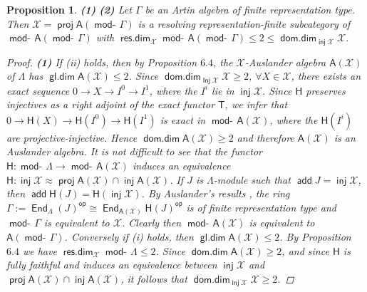 \documentclass[oneside, a4paper,reqno]{amsart}
\numberwithin{equation}{section}
\newtheorem{prop}[thm]{Proposition}
\theoremstyle{definition}
\begin{document}
\begin{prop} {\bf (1)}
{\bf (2)} Let $\Gamma$ be an Artin algebra of finite representation
type. Then ${\mathcal X} = \operatorname*{\mathsf{proj}}\mathsf{A}(\operatorname*{\mathsf{mod}-\!}\Gamma)$ is a resolving
representation-finite subcategory of $\operatorname*{\mathsf{mod}-\!}\mathsf{A}(\operatorname*{\mathsf{mod}-\!}\Gamma)$
with $\operatorname*{\mathsf{res.dim}}_{\mathcal X}\operatorname*{\mathsf{mod}-\!}\mathsf{A}(\operatorname*{\mathsf{mod}-\!}\Gamma) \leq 2 \leq
\operatorname*{\mathsf{dom.dim}}_{\operatorname*{\mathsf{inj}}{\mathcal X}}{\mathcal X}$.
\begin{proof} {\bf (1)} If (ii) holds, then by Proposition $6.4$, the
${\mathcal X}$-Auslander algebra $\mathsf{A}({\mathcal X})$ of $\Lambda$ has
$\operatorname*{\mathsf{gl.dim}}\mathsf{A}({\mathcal X}) \leq 2$. Since $\operatorname*{\mathsf{dom.dim}}_{\operatorname*{\mathsf{Inj}}{\mathcal X}}{\mathcal X} \geq 2$, $\forall
X\in{\mathcal X}$, there exists an exact sequence $0 {\longrightarrow} X {\longrightarrow} I^{0} {\longrightarrow}
I^{1}$, where the $I^i$ lie in $\operatorname*{\mathsf{inj}}{\mathcal X}$. Since $\mathsf{H}$
preserves injectives as a right adjoint of the exact functor
$\mathsf{T}$, we infer that $0 {\longrightarrow} \mathsf{H}(X) {\longrightarrow}
\mathsf{H}(I^{0}) {\longrightarrow} \mathsf{H}(I^{1})$ is exact in
$\operatorname*{\mathsf{mod}-\!}\mathsf{A}({\mathcal X})$, where the $\mathsf{H}(I^{i})$ are
projective-injective. Hence $\operatorname*{\mathsf{dom.dim}}\mathsf{A}({\mathcal X})\geq 2$  and therefore
$\mathsf{A}({\mathcal X})$ is an Auslander algebra. It is not difficult to see
that the functor $\mathsf{H} : \operatorname*{\mathsf{mod}-\!}\Lambda {\longrightarrow}
\operatorname*{\mathsf{mod}-\!}\mathsf{A}({\mathcal X})$ induces an equivalence $\mathsf{H} : \operatorname*{\mathsf{inj}}{\mathcal X}
\approx \operatorname*{\mathsf{proj}}\mathsf{A}({\mathcal X}) \cap \operatorname*{\mathsf{inj}}\mathsf{A}({\mathcal X})$.  If $J$ is
$\Lambda$-module such that $\operatorname*{\mathsf{add}} J = \operatorname*{\mathsf{inj}}{\mathcal X}$, then
$\operatorname*{\mathsf{add}}\mathsf{H}(J) = \mathsf{H}(\operatorname*{\mathsf{inj}}{\mathcal X})$. By Auslander's results
\cite{Auslander:queen}, the ring $\Gamma := \operatorname*{\mathsf{End}}_{\Lambda}(J)^\operatorname*{\mathsf{op}}
\cong \operatorname*{\mathsf{End}}_{\mathsf{A}({\mathcal X})}\mathsf{H}(J)^\operatorname*{\mathsf{op}}$ is of finite
representation type and $\operatorname*{\mathsf{mod}-\!}\Gamma$ is equivalent to ${\mathcal X}$. Clearly
then $\operatorname*{\mathsf{mod}-\!}\mathsf{A}({\mathcal X})$ is equivalent to
$\mathsf{A}(\operatorname*{\mathsf{mod}-\!}\Gamma)$. Conversely if (i) holds, then
$\operatorname*{\mathsf{gl.dim}}\mathsf{A}({\mathcal X}) \leq 2$. By Proposition $6.4$ we have
$\operatorname*{\mathsf{res.dim}}_{\mathcal X}\operatorname*{\mathsf{mod}-\!}\Lambda \leq 2$. Since $\operatorname*{\mathsf{dom.dim}}\mathsf{A}({\mathcal X}) \geq 2$, and
since $\mathsf{H}$ is fully faithful and induces an equivalence
between $\operatorname*{\mathsf{inj}}{\mathcal X}$ and $\operatorname*{\mathsf{proj}}\mathsf{A}({\mathcal X}) \cap \operatorname*{\mathsf{inj}}\mathsf{A}({\mathcal X})$,
it follows that $\operatorname*{\mathsf{dom.dim}}_{\operatorname*{\mathsf{inj}}{\mathcal X}}{\mathcal X} \geq 2$.


\end{proof}
\end{prop}
\end{document}
